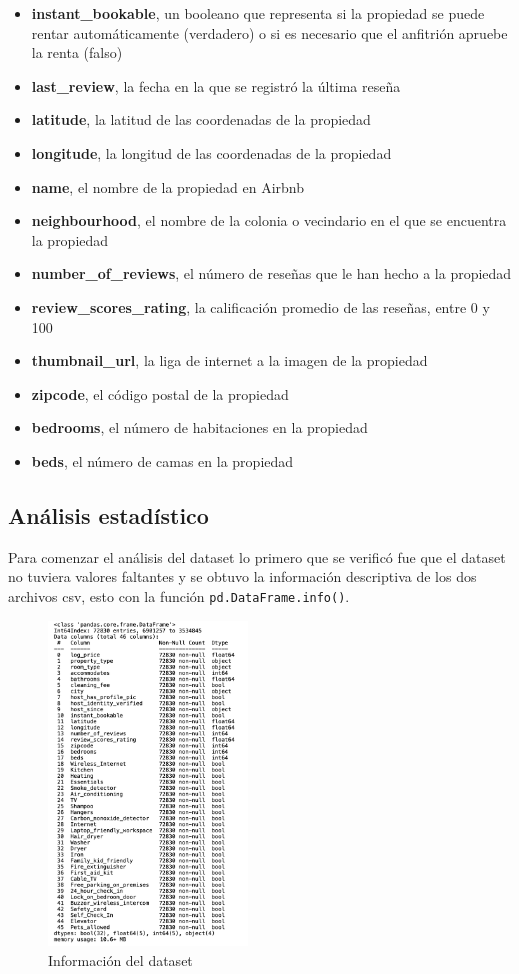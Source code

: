 \documentclass[sigconf,authorversion,nonacm]{acmart}
\begin{document}
\begin{itemize}
  \item \textbf{instant\_bookable}, un booleano que representa si la propiedad se puede rentar automáticamente (verdadero) o si es necesario que el anfitrión apruebe la renta (falso)
  \item \textbf{last\_review}, la fecha en la que se registró la última reseña
  \item \textbf{latitude}, la latitud de las coordenadas de la propiedad
  \item \textbf{longitude}, la longitud de las coordenadas de la propiedad
  \item \textbf{name}, el nombre de la propiedad en Airbnb
  \item \textbf{neighbourhood}, el nombre de la colonia o vecindario en el que se encuentra la propiedad
  \item \textbf{number\_of\_reviews}, el número de reseñas que le han hecho a la propiedad
  \item \textbf{review\_scores\_rating}, la calificación promedio de las reseñas, entre 0 y 100
  \item \textbf{thumbnail\_url}, la liga de internet a la imagen de la propiedad
  \item \textbf{zipcode}, el código postal de la propiedad
  \item \textbf{bedrooms}, el número de habitaciones en la propiedad
  \item \textbf{beds}, el número de camas en la propiedad
\end{itemize}


\subsection{Análisis estadístico}
Para comenzar el análisis del dataset lo primero que se verificó fue que el dataset no tuviera valores faltantes y se obtuvo la información  descriptiva de los dos archivos csv, esto con la función \texttt{pd.DataFrame.info()}.

\begin{figure}[H]
  \centering
  \includegraphics[width=150pt]{info.png}
  \caption{Información del dataset}
\end{figure}
\end{document}

